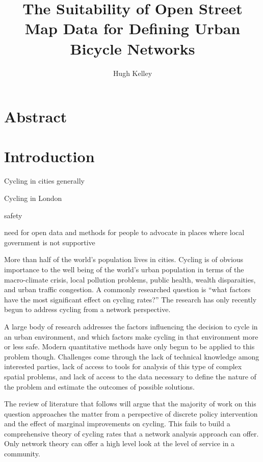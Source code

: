\documentclass[11pt]{article} %
\title{\vspace{-3.0cm}The Suitability of Open Street Map Data for Defining Urban Bicycle Networks}
\author{Hugh Kelley}
\begin{document}
\maketitle
\section{Abstract}
\tableofcontents
\listoftables

\section{Introduction}

Cycling in cities generally

Cycling in London

safety

need for open data and methods for people to advocate in places where local government is not supportive

More than half of the world's population lives in cities. Cycling is of obvious importance to the well being of the world's  urban population in terms of the macro-climate crisis, local pollution problems,  public health, wealth disparaities, and urban traffic congestion. A commonly researched question is ``what factors have the most significant effect on cycling rates?'' The research has only recently begun to address cycling from a network perspective. 

A large body of research addresses the factors influencing the decision to cycle in an urban environment, and which factors make cycling in that environment more or less safe. Modern quantitative methods have only begun to be applied to this problem though. Challenges come through the lack of technical knowledge among interested parties, lack of access to tools for analysis of this type of complex spatial problems, and lack of access to the data necessary to define the nature of the problem and estimate the outcomes of possible solutions. 

 The review of literature that follows will argue that the majority of work on this question approaches the matter from a perspective of discrete policy intervention and the effect of marginal improvements on cycling. This fails to build a comprehensive theory of cycling rates that a network analysis approach can offer. Only network theory can offer a high level look at the level of service in a community. 
\end{document}
